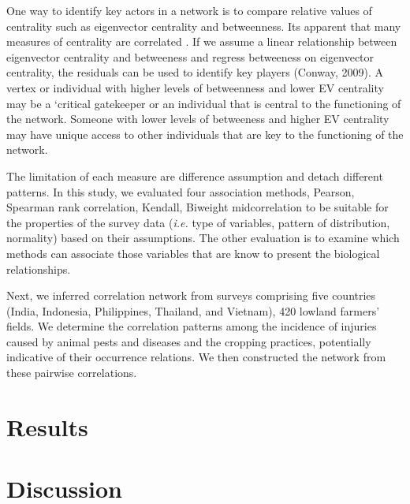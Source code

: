 \documentclass[a4paper]{article}
\begin{document}
One way to identify key actors in a network is to compare relative values of centrality such as eigenvector centrality and betweenness. Its apparent that many measures of centrality are correlated \citet{Valente:2008wd}. If we assume a linear relationship between eigenvector centrality and betweeness and regress betweeness on eigenvector centrality, the residuals can be used to identify key players (Conway, 2009).   A vertex or individual with higher levels of betweenness and lower EV centrality may be a ‘critical gatekeeper  or an individual that is central to the functioning of the network. Someone with lower levels of betweeness and higher EV centrality may have unique access to other individuals that are key to the functioning of the network.


The limitation of each measure are difference assumption and detach different patterns. In this study, we evaluated four association methods, Pearson, Spearman rank correlation, Kendall, Biweight midcorrelation to be suitable for the properties of the survey data (\textit{i.e.} type of variables, pattern of distribution, normality) based on their assumptions.  The other evaluation is to examine which methods can associate those variables that are know to present the biological relationships. 

Next, we inferred correlation network from surveys comprising five countries (India, Indonesia, Philippines, Thailand, and Vietnam), 420 lowland farmers' fields. We determine the correlation patterns among the incidence of injuries caused by animal pests and diseases and the cropping practices, potentially indicative of their occurrence relations. We then constructed the network from these pairwise correlations. 





\section*{Results}

\section*{Discussion}


\end{document}
